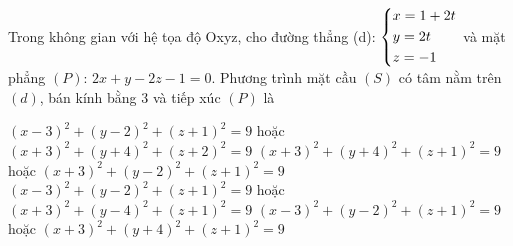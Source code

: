 \begin{ex}%
	Trong không gian với hệ tọa độ Oxyz, cho đường thẳng (d):  $\left\{\begin{aligned}
		& x=1+2t \\ 
		& y=2t \\ 
		& z=-1 \\ 
	\end{aligned}\right.$
	và mặt phẳng $(P)$: $2x +y-2z-1 = 0$. Phương trình mặt cầu $(S)$ có tâm nằm trên $(d)$, bán kính bằng $3$ và tiếp xúc $(P)$ là
	
	\choice
	{ ${{\left( x-3 \right)}^{2}}+{{\left( y-2 \right)}^{2}}+{{\left( z+1 \right)}^{2}}=9$ hoặc $ {{\left( x+3 \right)}^{2}}+{{\left( y+4 \right)}^{2}}+{{(z+2)}^{2}}=9$            }
	{ ${{\left( x+3 \right)}^{2}}+{{\left( y+4 \right)}^{2}}+{{(z+1)}^{2}}=9$ hoặc $ {{\left( x+3 \right)}^{2}}+{{\left( y-2 \right)}^{2}}+{{\left( z+1 \right)}^{2}}=9$}  
	{${{\left( x-3 \right)}^{2}}+{{\left( y-2 \right)}^{2}}+{{\left( z+1 \right)}^{2}}=9 $ hoặc $ {{\left( x+3 \right)}^{2}}+{{\left( y-4 \right)}^{2}}+{{(z+1)}^{2}}=9$}
	{\True ${{\left( x-3 \right)}^{2}}+{{\left( y-2 \right)}^{2}}+{{\left( z+1 \right)}^{2}}=9$ hoặc $ {{\left( x+3 \right)}^{2}}+{{\left( y+4 \right)}^{2}}+{{(z+1)}^{2}}=9$}
\end{ex}

